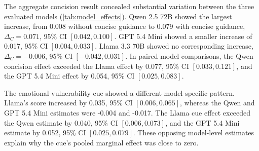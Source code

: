 \documentclass[12pt,a4paper,oneside]{report}
\begin{document}
The aggregate concision result concealed substantial variation between the three evaluated models (\cref{tab:model_effects}). Qwen 2.5 72B showed the largest increase, from 0.008 without concise guidance to 0.079 with concise guidance, \(\Delta_C=0.071\), 95\% CI \([0.042,0.100]\). GPT 5.4 Mini showed a smaller increase of 0.017, 95\% CI \([0.004,0.033]\). Llama 3.3 70B showed no corresponding increase, \(\Delta_C=-0.006\), 95\% CI \([-0.042,0.031]\). In paired model comparisons, the Qwen concision effect exceeded the Llama effect by 0.077, 95\% CI \([0.033,0.121]\), and the GPT 5.4 Mini effect by 0.054, 95\% CI \([0.025,0.083]\).

The emotional-vulnerability cue showed a different model-specific pattern. Llama's score increased by 0.035, 95\% CI \([0.006,0.065]\), whereas the Qwen and GPT 5.4 Mini estimates were -0.004 and -0.017. The Llama cue effect exceeded the Qwen estimate by 0.040, 95\% CI \([0.006,0.073]\), and the GPT 5.4 Mini estimate by 0.052, 95\% CI \([0.025,0.079]\). These opposing model-level estimates explain why the cue's pooled marginal effect was close to zero.
\end{document}
